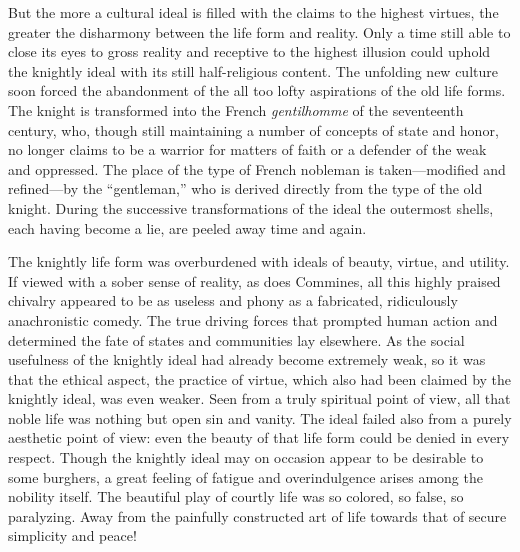 But the more a cultural ideal is filled with the claims to the highest
virtues, the greater the disharmony between the life form and reality.
Only a time still able to close its eyes to gross reality and receptive
to the highest illusion could uphold the knightly ideal with its still
half-religious content. The unfolding new culture soon forced the
abandonment of the all too lofty aspirations of the old life forms. The
knight is transformed into the French \emph{gentilhomme} of the
seventeenth century, who, though still maintaining a number of concepts
of state and honor, no longer claims to be a warrior for matters of
faith or a defender of the weak and oppressed. The place of the type of
French nobleman is taken---modified and refined---by the ``gentleman,''
who is derived directly from the type of the old knight. During the
successive transformations of the
\protect\hypertarget{10_Chapter_Three__THE_HEROIC_DREAM.xhtmlux5cux23page_120}{}{}ideal
the outermost shells, each having become a lie, are peeled away time and
again.

The knightly life form was overburdened with ideals of beauty, virtue,
and utility. If viewed with a sober sense of reality, as does Commines,
all this highly praised chivalry appeared to be as useless and phony as
a fabricated, ridiculously anachronistic comedy. The true driving forces
that prompted human action and determined the fate of states and
communities lay elsewhere. As the social usefulness of the knightly
ideal had already become extremely weak, so it was that the ethical
aspect, the practice of virtue, which also had been claimed by the
knightly ideal, was even weaker. Seen from a truly spiritual point of
view, all that noble life was nothing but open sin and vanity. The ideal
failed also from a purely aesthetic point of view: even the beauty of
that life form could be denied in every respect. Though the knightly
ideal may on occasion appear to be desirable to some burghers, a great
feeling of fatigue and overindulgence arises among the nobility itself.
The beautiful play of courtly life was so colored, so false, so
paralyzing. Away from the painfully constructed art of life towards that
of secure simplicity and peace!

